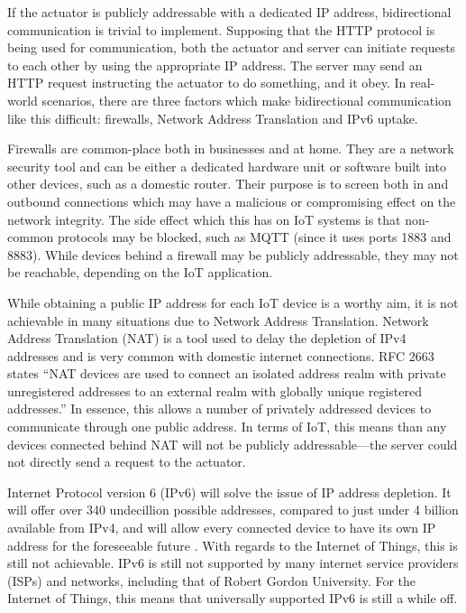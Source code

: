       If the actuator is publicly addressable with a dedicated IP address, bidirectional communication is trivial to implement. Supposing that the HTTP protocol is being used for communication, both the actuator and server can initiate requests to each other by using the appropriate IP address. The server may send an HTTP request instructing the actuator to do something, and it obey. In real-world scenarios, there are three factors which make bidirectional communication like this difficult: firewalls, Network Address Translation and IPv6 uptake.

      Firewalls are common-place both in businesses and at home. They are a network security tool and can be either a dedicated hardware unit or software built into other devices, such as a domestic router. Their purpose is to screen both in and outbound connections which may have a malicious or compromising effect on the network integrity. The side effect which this has on IoT systems is that non-common protocols may be blocked, such as MQTT (since it uses ports 1883 and 8883). While devices behind a firewall may be publicly addressable, they may not be reachable, depending on the IoT application.

      While obtaining a public IP address for each IoT device is a worthy aim, it is not achievable in many situations due to Network Address Translation. Network Address Translation (NAT) is a tool used to delay the depletion of IPv4 addresses and is very common with domestic internet connections. RFC 2663 \citep{rfc2663} states ``NAT devices are used to connect an isolated address realm with private unregistered addresses to an external realm with globally unique registered addresses.'' In essence, this allows a number of privately addressed devices to communicate through one public address. In terms of IoT, this means than any devices connected behind NAT will not be publicly addressable---the server could not directly send a request to the actuator.

      Internet Protocol version 6 (IPv6) will solve the issue of IP address depletion. It will offer over 340 undecillion possible addresses, compared to just under 4 billion available from IPv4, and will allow every connected device to have its own IP address for the foreseeable future \citep{ipv6:2008}. With regards to the Internet of Things, this is still not achievable. IPv6 is still not supported by many internet service providers (ISPs) and networks, including that of Robert Gordon University. For the Internet of Things, this means that universally supported IPv6 is still a while off.

